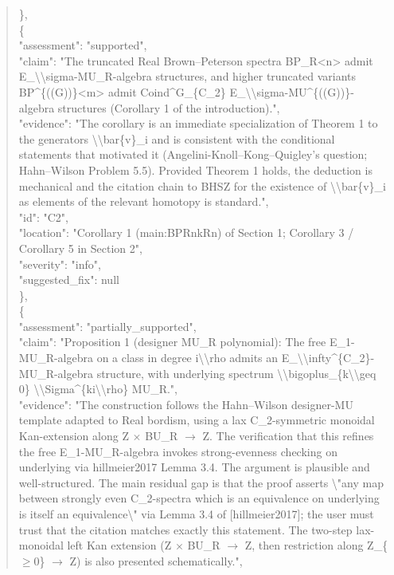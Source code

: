 \documentclass[11pt]{article}
\begin{document}
\begin{quote}
    \},\\
    \{\\
      "assessment": "supported",\\
      "claim": "The truncated Real Brown--Peterson spectra BP\_R<n> admit E\_\textbackslash{}\textbackslash{}sigma-MU\_R-algebra structures, and higher truncated variants BP\^{}\{((G))\}<m> admit Coind\^{}G\_\{C\_2\} E\_\textbackslash{}\textbackslash{}sigma-MU\^{}\{((G))\}-algebra structures (Corollary 1 of the introduction).",\\
      "evidence": "The corollary is an immediate specialization of Theorem 1 to the generators \textbackslash{}\textbackslash{}bar\{v\}\_i and is consistent with the conditional statements that motivated it (Angelini-Knoll--Kong--Quigley's question; Hahn--Wilson Problem 5.5). Provided Theorem 1 holds, the deduction is mechanical and the citation chain to BHSZ for the existence of \textbackslash{}\textbackslash{}bar\{v\}\_i as elements of the relevant homotopy is standard.",\\
      "id": "C2",\\
      "location": "Corollary 1 (main:BPRnkRn) of Section 1; Corollary 3 / Corollary 5 in Section 2",\\
      "severity": "info",\\
      "suggested\_fix": null\\
    \},\\
    \{\\
      "assessment": "partially\_supported",\\
      "claim": "Proposition 1 (designer MU\_R polynomial): The free E\_1-MU\_R-algebra on a class in degree i\textbackslash{}\textbackslash{}rho admits an E\_\textbackslash{}\textbackslash{}infty\^{}\{C\_2\}-MU\_R-algebra structure, with underlying spectrum \textbackslash{}\textbackslash{}bigoplus\_\{k\textbackslash{}\textbackslash{}geq 0\} \textbackslash{}\textbackslash{}Sigma\^{}\{ki\textbackslash{}\textbackslash{}rho\} MU\_R.",\\
      "evidence": "The construction follows the Hahn--Wilson designer-MU template adapted to Real bordism, using a lax C\_2-symmetric monoidal Kan-extension along Z \ensuremath{\times} BU\_R \ensuremath{\to} Z. The verification that this refines the free E\_1-MU\_R-algebra invokes strong-evenness checking on underlying via hillmeier2017 Lemma 3.4. The argument is plausible and well-structured. The main residual gap is that the proof asserts \textbackslash{}"any map between strongly even C\_2-spectra which is an equivalence on underlying is itself an equivalence\textbackslash{}" via Lemma 3.4 of [hillmeier2017]; the user must trust that the citation matches exactly this statement. The two-step lax-monoidal left Kan extension (Z \ensuremath{\times} BU\_R \ensuremath{\to} Z, then restriction along Z\_\{\ensuremath{\ge}0\} \ensuremath{\to} Z) is also presented schematically.",\\

\end{quote}
\end{document}
